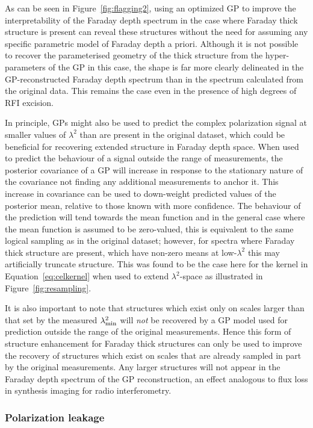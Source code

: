 \documentclass[fleqn,usenatbib]{mnras}
\begin{document}
As can be seen in Figure~\ref{fig:flagging2}, using an optimized GP to improve the interpretability of the Faraday depth spectrum in the case where Faraday thick structure is present can reveal these structures without the need for assuming any specific parametric model of Faraday depth a priori. Although it is not possible to recover the parameterised geometry of the thick structure from the hyper-parameters of the GP in this case, the shape is far more clearly delineated in the GP-reconstructed Faraday depth spectrum than in the spectrum calculated from the original data. This remains the case even in the presence of high degrees of RFI excision.

In principle, GPs might also be used to predict the complex polarization signal at smaller values of $\lambda^2$ than are present in the original dataset, which could be beneficial for recovering extended structure in Faraday depth space. When used to predict the behaviour of a signal outside the range of measurements, the posterior covariance of a GP will increase in response to the stationary nature of the covariance not finding any additional measurements to anchor it. This increase in covariance can be used to down-weight predicted values of the posterior mean, relative to those known with more confidence. The behaviour of the prediction will tend towards the mean function and in the general case where the mean function is assumed to be zero-valued, this is equivalent to the same logical sampling as in the original dataset; however, for spectra where Faraday thick structure are present, which have non-zero means at low-$\lambda^2$ this may artificially truncate structure. This was found to be the case here for the kernel in Equation~\ref{eq:celkernel} when used to extend $\lambda^2$-space as illustrated in Figure~\ref{fig:resampling}.

It is also important to note that structures which exist only on scales larger than that set by the measured $\lambda^2_{\rm min}$ will {\it not} be recovered by a GP model used for prediction outside the range of the original measurements. Hence this form of structure enhancement for Faraday thick structures can only be used to improve the recovery of structures which exist on scales that are already sampled in part by the original measurements. Any larger structures will not appear in the Faraday depth spectrum of the GP reconstruction, an effect analogous to flux loss in synthesis imaging for radio interferometry. 


\subsubsection{Polarization leakage}
\label{sec:leakage}
\end{document}
